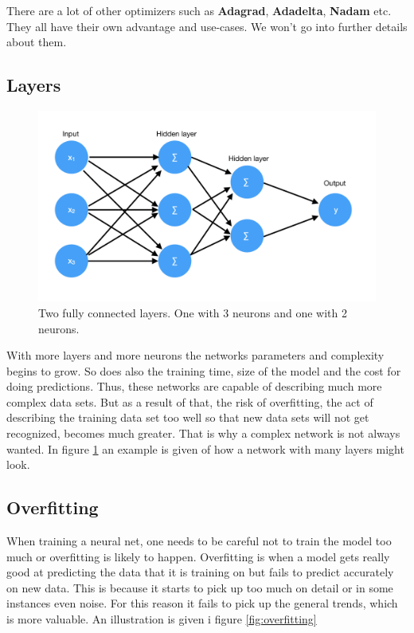 There are a lot of other optimizers such as \textbf{Adagrad}, \textbf{Adadelta}, \textbf{Nadam} etc. They all have their own advantage and use-cases. We won't go into further details about them.

\subsection{Layers}

\begin{figure}[hbtp]
\begin{center}
\includegraphics[width = 1.0\textwidth]{./Images/fully_connected.jpg} 
\caption{Two fully connected layers. One with 3 neurons and one with 2 neurons.}
\label{fig:layers}
\end{center}
\end{figure}

With more layers and more neurons the networks parameters and complexity begins to grow. So does also the training time, size of the model and the cost for doing predictions. 
Thus, these networks are capable of describing much more complex data sets. But as a result of that, the risk of overfitting, the act of describing the training data set too well so that new data sets will not get recognized, becomes much greater.
That is why a complex network is not always wanted.
In figure \ref{fig:layers} an example is given of how a network with many layers might look.

\subsection{Overfitting}
\label{overfitting}
When training a neural net, one needs to be careful not to train the model too much or overfitting is likely to happen.
Overfitting is when a model gets really good at predicting the data that it is training on but fails to predict accurately on new data.
This is because it starts to pick up too much on detail or in some instances even noise.
For this reason it fails to pick up the general trends, which is more valuable.
An illustration is given i figure \ref{fig:overfitting}

